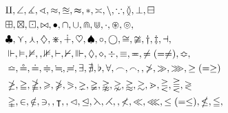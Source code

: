 \begin{align}
&\amalg, \angle, \measuredangle, \sphericalangle, \approx, \approxeq, \thickapprox, \ast, \asymp, \backslash, \because, \between,  \bot, \boxminus\\
&\boxplus, \boxtimes, \boxdot, \bowtie, \bullet, \cap, \cup, \Cap, \Cup, \cdot, \circledast, \circledcirc, \\
&\clubsuit, \curlyvee, \curlywedge, \diamondsuit, \divideontimes, \dotplus, \heartsuit, \spadesuit, \circ, \bigcirc, \cong, \ncong, \dagger, \ddagger, \dashv, \\
&\Vdash, \vDash, \nvDash, , \nVDash, \vdash, \nvdash, \Vvdash, \Diamond, \diamond, \div, \equiv, \eqcirc, \neq ( = \ne), \Bumpeq, \\
&\bumpeq, \circeq, \doteq, \doteqdot, \fallingdotseq, \risingdotseq, \exists, \nexists, \flat, \forall, \frown, \smallfrown, , \ngtr, \gg, \ggg, \geq ( = \ge)\\
& \ngeq, \geqq, \ngeqq, \geqslant, \ngeqslant, \eqslantgtr, \gneq, \gneqq, \gnapprox, \gnsim, \gtrapprox, \gtrsim, \gtrdot, \gtreqless, \gtreqqless, \gtrless\\
&  \gvertneqq, \in, \notin, \ni, , \intercal, , \lhd, \unlhd, \leftthreetimes, \rightthreetimes, , \nless, \ll, \lll, \leq ( = \le), \nleq, \leqq, \\

\end{align}
